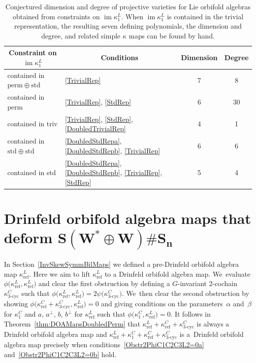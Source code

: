 \documentclass[pdftex]{sigma}
\numberwithin{equation}{section}
\DeclareMathOperator{\im}{im}
\DeclareMathOperator{\refl}{ref}
\DeclareMathOperator{\tri}{3-cyc}
\begin{document}
\begin{table}[hbt]
\begin{center}
\caption{Conjectured dimension and degree of projective varieties %
for Lie orbifold algebras obtained from constraints on $\im \kappa^L_1$. When $\im \kappa^L_1$ is contained in the trivial representation, the resulting seven defining polynomials, the dimension and degree, and related simple $\kappa$ maps can be found by hand.}\label{table:subvars}

\vspace{2mm}

\renewcommand{\arraystretch}{1.2}%
\begin{tabular}{l|l|c|c}
\hline
\multicolumn{1}{c|}{Constraint on $\im \kappa^L_1$} & \multicolumn{1}{c|}{Conditions} & \multicolumn{1}{c|}{Dimension} & \multicolumn{1}{c}{Degree}\\
\hline
contained in $\mathrm{perm} \oplus \mathrm{std}$ & \eqref{TrivialRep} & 7 & 8 \\
contained in $\mathrm{perm}$ & \eqref{TrivialRep}, \eqref{StdRep} & 6 & 30 \\
contained in $\mathrm{triv}$ & \eqref{TrivialRep}, \eqref{StdRep}, \eqref{DoubledTrivialRep} & 4 & 1 \\
contained in $\mathrm{std} \oplus \mathrm{std}$ & \eqref{DoubledStdRepa}, \eqref{DoubledStdRepb}, \eqref{TrivialRep} & 6 & 6 \\
contained in std & \eqref{DoubledStdRepa}, \eqref{DoubledStdRepb}, \eqref{TrivialRep}, \eqref{StdRep} & 5 & 4
\\
\hline
\end{tabular}
\end{center}
\end{table}

\section[Drinfeld orbifold algebra maps that deform S(W* + W) Sn]
{Drinfeld orbifold algebra maps that deform $\boldsymbol{S(W^* \oplus W)\# S_n}$}\label{Lifting}

In Section~\ref{InvSkewSymmBilMaps} we defined a pre-Drinfeld orbifold algebra map
$\kappa^L_{\refl}$. Here we aim to lift $\kappa^L_{\refl}$ to a Drinfeld orbifold
algebra map. We~evaluate $\phi\big(\kappa^L_{\refl},\kappa^L_{\refl}\big)$
and clear the first obstruction by defining a $G$-invariant $2$-cochain
$\kappa^C_{\tri}$ such that $\phi\big(\kappa^L_{\refl},\kappa^L_{\refl}\big)=2\psi\big(\kappa^C_{\tri}\big)$. We~then clear the second obstruction by showing
$\phi\big(\kappa^C_{\refl}+\kappa^C_{\tri},\kappa^L_{\refl}\big)=0$ and giving conditions on
the parameters~$\alpha$ and~$\beta$ for $\kappa^C_1$ and $a$, $a^\perp$, $b$, $b^\perp$
for $\kappa^L_{\refl}$ such that $\phi\big(\kappa^C_1,\kappa^L_{\refl}\big)=0$. It follows
in Theorem~\ref{thm:DOAMapsDoubledPerm} that
$\kappa^L_{\refl}+\kappa^C_{\refl}+\kappa^C_{\tri}$ is always a Drinfeld orbifold
algebra map and $\kappa^L_{\refl}+\kappa^C_1+\kappa^C_{\refl}+\kappa^C_{\tri}$ is
a~Drinfeld orbifold algebra map precisely when conditions~\eqref{Obstr2PhiC1C2C3L2=0a}
and~\eqref{Obstr2PhiC1C2C3L2=0b} hold.
\end{document}
